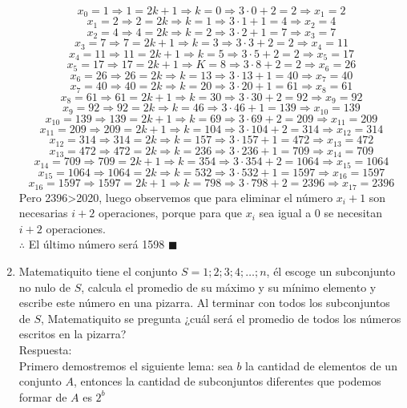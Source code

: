 \documentclass{book}
\begin{document}
\begin{enumerate}
          $$x_0=1\Rightarrow 1=2k+1\Rightarrow k=0\Rightarrow 3\cdot 0+2=2\Rightarrow x_1=2$$
          $$x_1=2\Rightarrow 2=2k\Rightarrow k=1\Rightarrow 3\cdot 1+1=4\Rightarrow x_2=4$$
          $$x_2=4\Rightarrow 4=2k\Rightarrow k=2\Rightarrow 3\cdot 2+1=7\Rightarrow x_3=7$$
          $$x_3=7\Rightarrow 7=2k+1\Rightarrow k=3\Rightarrow 3\cdot 3+2=2\Rightarrow x_4=11$$
          $$x_4=11\Rightarrow 11=2k+1\Rightarrow k=5\Rightarrow 3\cdot 5+2=2\Rightarrow x_5=17$$
          $$x_5=17\Rightarrow 17=2k+1\Rightarrow K=8\Rightarrow 3\cdot 8+2=2\Rightarrow x_6=26$$
          $$x_6=26\Rightarrow 26=2k\Rightarrow k=13\Rightarrow 3\cdot 13+1=40\Rightarrow x_7=40$$
          $$x_7=40\Rightarrow 40=2k\Rightarrow k=20\Rightarrow 3\cdot 20+1=61\Rightarrow x_8=61$$
          $$x_8=61\Rightarrow 61=2k+1\Rightarrow k=30\Rightarrow 3\cdot 30+2=92\Rightarrow x_9=92$$
          $$x_9=92\Rightarrow 92=2k\Rightarrow k=46\Rightarrow 3\cdot 46+1=139\Rightarrow x_10=139$$
          $$x_{10}=139\Rightarrow 139=2k+1\Rightarrow k=69\Rightarrow 3\cdot 69+2=209\Rightarrow x_{11}=209$$
          $$x_{11}=209\Rightarrow 209=2k+1\Rightarrow k=104\Rightarrow 3\cdot 104+2=314\Rightarrow x_{12}=314$$
          $$x_{12}=314\Rightarrow 314=2k\Rightarrow k=157\Rightarrow 3\cdot 157+1=472\Rightarrow x_{13}=472$$
          $$x_{13}=472\Rightarrow 472=2k\Rightarrow k=236\Rightarrow 3\cdot 236+1=709\Rightarrow x_{14}=709$$
          $$x_{14}=709\Rightarrow 709=2k+1\Rightarrow k=354\Rightarrow 3\cdot 354+2=1064\Rightarrow x_{15}=1064$$
          $$x_{15}=1064\Rightarrow 1064=2k\Rightarrow k=532\Rightarrow 3\cdot 532+1=1597\Rightarrow x_{16}=1597$$
          $$x_{16}=1597\Rightarrow 1597=2k+1\Rightarrow k=798\Rightarrow 3\cdot 798+2=2396\Rightarrow x_{17}=2396$$
          Pero 2396>2020, luego observemos que para eliminar el número $x_i+1$ son necesarias $i+2$ operaciones, porque para que $x_i$ sea igual a 0 se necesitan $i+2$ operaciones. \\
          $\therefore$ El último número será 1598 $\blacksquare$\\
    \item Matematiquito tiene el conjunto $S={1;2;3;4;\ldots ;n}$, él escoge un subconjunto no nulo de $S$, calcula el promedio de su máximo y su mínimo elemento y escribe este número en una pizarra. Al terminar con todos los subconjuntos de $S$, Matematiquito se pregunta ¿cuál será el promedio de todos los números escritos en la pizarra?\\
          Respuesta:\\
          Primero demostremos el siguiente lema: sea $b$ la cantidad de elementos de un conjunto $A$, entonces la cantidad de subconjuntos diferentes que podemos formar de $A$ es $2^b$\\

\end{enumerate}
\end{document}
